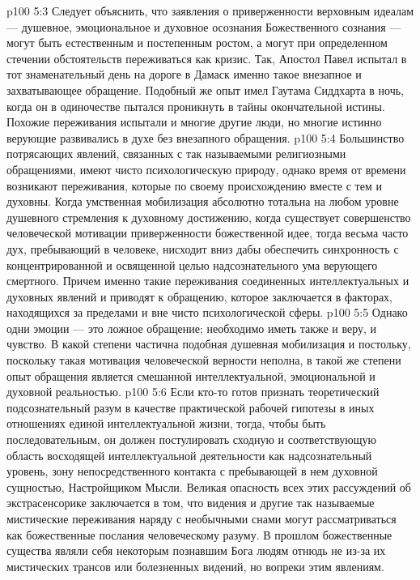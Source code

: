 \vs p100 5:3 \pc Следует объяснить, что заявления о приверженности верховным идеалам --- душевное, эмоциональное и духовное осознания Божественного сознания --- могут быть естественным и постепенным ростом, а могут при определенном стечении обстоятельств переживаться как кризис. Так, Апостол Павел испытал в тот знаменательный день на дороге в Дамаск именно такое внезапное и захватывающее обращение. Подобный же опыт имел Гаутама Сиддхарта в ночь, когда он в одиночестве пытался проникнуть в тайны окончательной истины. Похожие переживания испытали и многие другие люди, но многие истинно верующие развивались в духе без внезапного обращения.
\vs p100 5:4 Большинство потрясающих явлений, связанных с так называемыми религиозными обращениями, имеют чисто психологическую природу, однако время от времени возникают переживания, которые по своему происхождению вместе с тем и духовны. Когда умственная мобилизация абсолютно тотальна на любом уровне душевного стремления к духовному достижению, когда существует совершенство человеческой мотивации приверженности божественной идее, тогда весьма часто дух, пребывающий в человеке, нисходит вниз дабы обеспечить синхронность с концентрированной и освященной целью надсознательного ума верующего смертного. Причем именно такие переживания соединенных интеллектуальных и духовных явлений и приводят к обращению, которое заключается в факторах, находящихся за пределами и вне чисто психологической сферы.
\vs p100 5:5 Однако одни эмоции --- это ложное обращение; необходимо иметь также и веру, и чувство. В какой степени частична подобная душевная мобилизация и постольку, поскольку такая мотивация человеческой верности неполна, в такой же степени опыт обращения является смешанной интеллектуальной, эмоциональной и духовной реальностью.
\vs p100 5:6 \pc Если кто\hyp{}то готов признать теоретический подсознательный разум в качестве практической рабочей гипотезы в иных отношениях единой интеллектуальной жизни, тогда, чтобы быть последовательным, он должен постулировать сходную и соответствующую область восходящей интеллектуальной деятельности как надсознательный уровень, зону непосредственного контакта с пребывающей в нем духовной сущностью, Настройщиком Мысли. Великая опасность всех этих рассуждений об экстрасенсорике заключается в том, что видения и другие так называемые мистические переживания наряду с необычными снами могут рассматриваться как божественные послания человеческому разуму. В прошлом божественные существа являли себя некоторым познавшим Бога людям отнюдь не из\hyp{}за их мистических трансов или болезненных видений, но вопреки этим явлениям.
